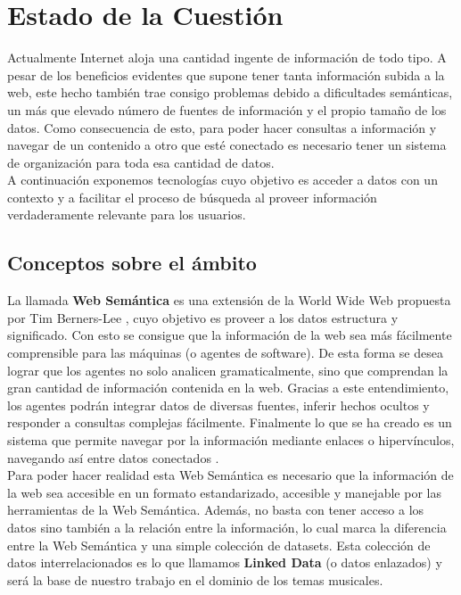 \chapter{Estado de la Cuestión}
\label{cap:estadoDeLaCuestion}

Actualmente Internet aloja una cantidad ingente de información de todo tipo. A pesar de los beneficios evidentes que supone tener tanta información subida a la web, este hecho también trae consigo problemas debido a dificultades semánticas, un más que elevado número de fuentes de información y el propio tamaño de los datos. Como consecuencia de esto, para poder hacer consultas a información y navegar de un contenido a otro que esté conectado es necesario tener un sistema de organización para toda esa cantidad de datos.\\

A continuación exponemos tecnologías cuyo objetivo es acceder a datos con un contexto y a facilitar el proceso de búsqueda al proveer información verdaderamente relevante para los usuarios.\\

\section{Conceptos sobre el ámbito}

La llamada \textbf{Web Semántica} es una extensión de la World Wide Web propuesta por Tim Berners-Lee \cite{berners2001}, cuyo objetivo es proveer a los datos estructura y significado. Con esto se consigue que la información de la web sea más fácilmente comprensible para las máquinas (o agentes de software). De esta forma se desea lograr que los agentes no solo analicen gramaticalmente, sino que comprendan la gran cantidad de información contenida en la web. Gracias a este entendimiento, los agentes podrán integrar datos de diversas fuentes, inferir hechos ocultos y responder a consultas complejas fácilmente. Finalmente lo que se ha creado es un sistema que permite navegar por la información mediante enlaces o hipervínculos, navegando así entre datos conectados \cite{sakr2018}.\\

Para poder hacer realidad esta Web Semántica es necesario que la información de la web sea accesible en un formato estandarizado, accesible y manejable por las herramientas de la Web Semántica. Además, no basta con tener acceso a los datos sino también a la relación entre la información, lo cual marca la diferencia entre la Web Semántica y una simple colección de datasets. Esta colección de datos interrelacionados es lo que llamamos \textbf{Linked Data} (o datos enlazados) y será la base de nuestro trabajo en el dominio de los temas musicales.\\

